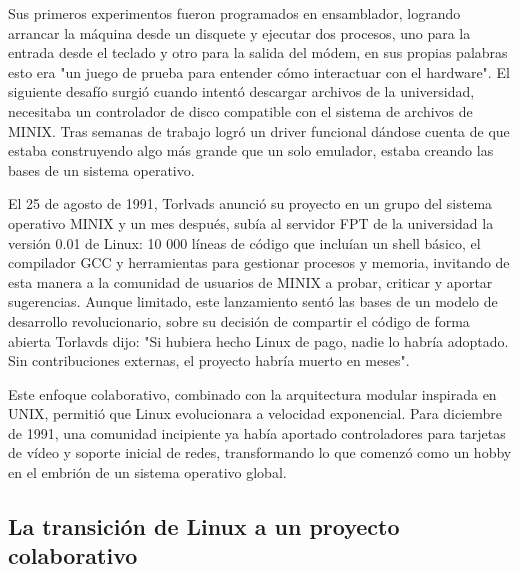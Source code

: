 \documentclass[a4paper,12pt]{article}
\begin{document}
Sus primeros experimentos fueron programados en ensamblador, logrando arrancar la máquina desde un disquete y 
ejecutar dos procesos, uno para la entrada desde el teclado y otro para la salida del módem, en sus propias 
palabras esto era "un juego de prueba para entender cómo interactuar con el hardware". El siguiente desafío 
surgió cuando intentó descargar archivos de la universidad, necesitaba un controlador de disco compatible con 
el sistema de archivos de MINIX. Tras semanas de trabajo logró un driver funcional dándose cuenta de que estaba 
construyendo algo más grande que un solo emulador, estaba creando las bases de un sistema operativo.

El 25 de agosto de 1991, Torlvads anunció su proyecto en un grupo del sistema operativo MINIX y un mes después, 
subía al servidor FPT de la universidad 
la versión 0.01 de Linux: 10 000 líneas de código que incluían un shell básico, el compilador GCC y herramientas 
para gestionar procesos y memoria, invitando de esta manera a la comunidad de usuarios de MINIX a probar, criticar 
y aportar sugerencias. Aunque limitado, este lanzamiento sentó las bases de un modelo de desarrollo 
revolucionario, sobre su decisión de compartir el código de forma abierta Torlavds dijo: "Si hubiera hecho Linux 
de pago, nadie lo habría adoptado. Sin contribuciones externas, el proyecto habría muerto en meses".

Este enfoque colaborativo, combinado con la arquitectura modular inspirada en UNIX, permitió que Linux 
evolucionara a velocidad exponencial. Para diciembre de 1991, una comunidad incipiente ya había aportado 
controladores para tarjetas de vídeo y soporte inicial de redes, transformando lo que comenzó como un 
hobby en el embrión de un sistema operativo global.

\subsection{La transición de Linux a un proyecto colaborativo}
\end{document}
